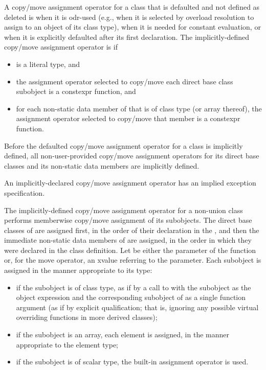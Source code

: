 \pnum
{}%
%
A copy/move assignment operator for a class 
that is defaulted and not defined as deleted
is
when it is odr-used
(e.g., when it is selected by overload resolution
to assign to an object of its class type),
when it is needed for constant evaluation, or
when it is explicitly defaulted after its first declaration.
The implicitly-defined copy/move assignment operator is  if
\begin{itemize}
\item
{} is a literal type, and

\item
the assignment operator selected to copy/move each direct base class subobject
is a constexpr function, and

\item
for each non-static data member of  that is of class type (or array
thereof), the assignment operator selected to copy/move that member is a
constexpr function.
\end{itemize}

\pnum
Before the defaulted copy/move assignment operator for a class is
implicitly defined,
all non-user-provided copy/move assignment operators for
its direct base classes and
its non-static data members are implicitly defined.
\begin{note}
An implicitly-declared copy/move assignment operator has an
implied exception specification.
\end{note}

\pnum
The implicitly-defined copy/move assignment operator for a
non-union class  performs memberwise copy/move assignment of its subobjects. The direct
base classes of  are assigned first, in the order of their declaration in the
, and then the immediate non-static data members of
 are assigned, in the order in which they were declared in the class
definition.
Let  be either the parameter of the function or, for the move operator, an
xvalue referring to the parameter.
Each subobject is assigned in the manner appropriate to its type:
\begin{itemize}
\item
if the subobject is of class type,
as if by a call to  with the subobject as the object expression
and the corresponding subobject of  as a single function argument
(as if by explicit qualification; that is,
ignoring any possible virtual overriding functions in more derived classes);
\item
if the subobject is an array, each element is assigned,
in the manner appropriate to the element type;
\item
if the subobject is of scalar type,
the built-in assignment operator is used.
\end{itemize}

